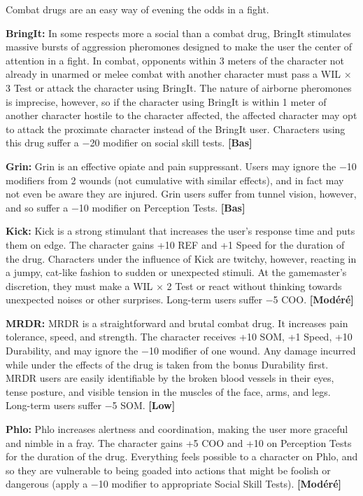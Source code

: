 {{Combat drugs are an easy way of evening the odds in a fight. 

\textbf{BringIt:} In some respects more a social than a combat drug, BringIt stimulates massive bursts of aggression pheromones designed to make the user the center of attention in a fight. In combat, opponents within 3 meters of the character not already in unarmed or melee combat with another character must pass a WIL $\times$ 3 Test or attack the character using BringIt. The nature of airborne pheromones is imprecise, however, so if the character using BringIt is within 1 meter of another character hostile to the character affected, the affected character may opt to attack the proximate character instead of the BringIt user. Characters using this drug suffer a $-$20 modifier on social skill tests. \textbf{[Bas]} 

\textbf{Grin:} Grin is an effective opiate and pain suppressant. Users may ignore the $-$10 modifiers from 2 wounds (not cumulative with similar effects), and in fact may not even be aware they are injured. Grin users suffer from tunnel vision, however, and so suffer a $-$10 modifier on Perception Tests. \textbf{[Bas]} 

\textbf{Kick:} Kick is a strong stimulant that increases the user’s response time and puts them on edge. The character gains +10 REF and +1 Speed for the duration of the drug. Characters under the influence of Kick are twitchy, however, reacting in a jumpy, cat-like fashion to sudden or unexpected stimuli. At the gamemaster’s discretion, they must make a WIL $\times$ 2 Test or react without thinking towards unexpected noises or other surprises. Long-term users suffer $-$5 COO. \textbf{[Modéré]} 

\textbf{MRDR:} MRDR is a straightforward and brutal combat drug. It increases pain tolerance, speed, and strength. The character receives +10 SOM, +1 Speed, +10 Durability, and may ignore the $-$10 modifier of one wound. Any damage incurred while under the effects of the drug is taken from the bonus Durability first. MRDR users are easily identifiable by the broken blood vessels in their eyes, tense posture, and visible tension in the muscles of the face, arms, and legs. Long-term users suffer $-$5 SOM. \textbf{[Low]} 

\textbf{Phlo:} Phlo increases alertness and coordination, making the user more graceful and nimble in a fray. The character gains +5 COO and +10 on Perception Tests for the duration of the drug. Everything feels possible to a character on Phlo, and so they are vulnerable to being goaded into actions that might be foolish or dangerous (apply a $-$10 modifier to appropriate Social Skill Tests). \textbf{[Modéré]} 

}}
